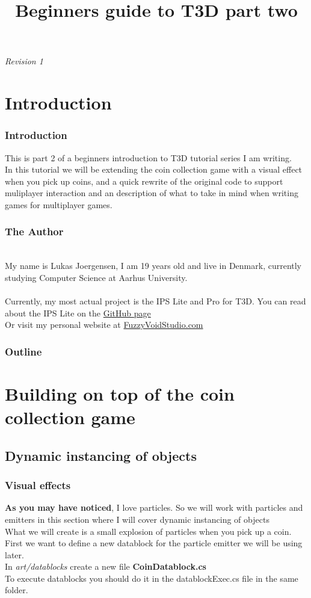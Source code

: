 
\title{Beginners guide to T3D part two}

\begin{frame}
\titlepage
{\it Revision 1}
\end{frame}

\section{Introduction}
\begin{frame}
\frametitle{Introduction}
	This is part 2 of a beginners introduction to T3D tutorial series I am writing.\\
	In this tutorial we will be extending the coin collection game with a visual effect when you pick up coins, 
	and a quick rewrite of the original code to support muliplayer interaction and an description of what to take in mind when writing games for multiplayer games.\\
\end{frame}
\begin{frame}[fragile]
\frametitle{The Author}
	\\
	My name is Lukas Joergensen, I am 19 years old and live in Denmark, currently studying Computer Science at Aarhus University.\\
	\\
	Currently, my most actual project is the IPS Lite and Pro for T3D. You can read about the IPS Lite on the {\color{blue}\href{https://github.com/lukaspj/IPS-Lite-for-T3D}{GitHub page}}\\
	Or visit my personal website at {\color{blue}\href{http://fuzzyvoidstudio.com/}{FuzzyVoidStudio.com}}
\end{frame}
\begin{frame}
\frametitle{Outline}
\tableofcontents[]
\end{frame}

\section{Building on top of the coin collection game}
\subsection*{Dynamic instancing of objects}
\begin{frame}
\frametitle{Visual effects}
{\bf As you may have noticed}, I love particles. So we will work with particles and emitters in this section where I will cover dynamic instancing of objects\\
What we will create is a small explosion of particles when you pick up a coin.\\
First we want to define a new datablock for the particle emitter we will be using later.\\
In {\it art/datablocks} create a new file {\bf CoinDatablock.cs}\\
To execute datablocks you should do it in the datablockExec.cs file in the same folder.
\end{frame}

